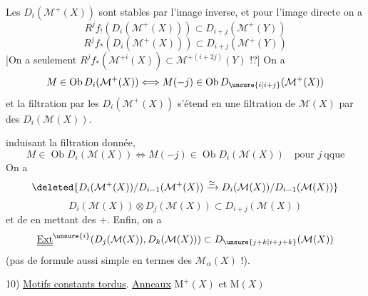 Les $D_i(\mathcal{M}^+(X))$ sont stables par l'image inverse,
et pour l'image directe on a
\[
R^jf_!(D_i(\mathcal{M}^+(X)))\subset D_{i+j}(\mathcal{M}^+(Y))
\]
\[
R^jf_*(D_i(\mathcal{M}^+(X)))\subset D_{i+j}(\mathcal{M}^+(Y))
\]
[On a seulement
$R^jf_*(\mathcal{M}^{+i}(X))\subset \mathcal{M}^{+(i+2j)}(Y)$ !?]
On  a
\[
M\in\operatorname{Ob}D_i(\mathcal{M}^+(X))
\Longleftrightarrow
M(-j)\in\operatorname{Ob}D_{\unsure{i|i+j}}(\mathcal{M}^+(X))
\]
et la filtration  par les $D_i(\mathcal{M}^+(X))$ s'étend
en une filtration de $\mathcal{M}(X)$ par des $D_i(\mathcal{M}(X))$.

induisant la filtration donnée, 
\[
M\in\operatorname{Ob}D_i(\mathcal{M}(X))\Longleftrightarrow
M(-j)\in\operatorname{Ob}D_i(\mathcal{M}(X))
\quad\text{pour }j\ \text{qque}
\]
On a
\[
\deleted{D_i(\mathcal{M}^+(X))/D_{i-1}(\mathcal{M}^+(X))
\xrightarrow{\simeq}D_i(\mathcal{M}(X))/D_{i-1}(\mathcal{M}(X))}
\]
\[
D_i(\mathcal{M}(X))\otimes D_j(\mathcal{M}(X))\subset D_{i+j}(\mathcal{M}(X))
\]
et de  en mettant des $+$.
Enfin, on a
\[
\underline{\underline{\operatorname{Ext}}}^{\unsure{i}}(D_j(\mathcal{M}(X)),D_k(\mathcal{M}(X)))
\subset D_{\unsure{j+k|i+j+k}}(\mathcal{M}(X))
\]
(pas de formule aussi simple en termes
des $\mathcal{M}_\alpha(X)$ !).

10) \uline{Motifs constants tordus}. \uline{Anneaux} $\mathrm{M}^+(X)$ et $\mathrm{M}(X)$

